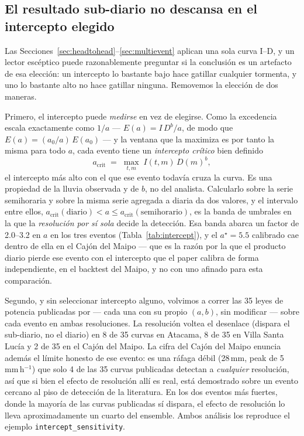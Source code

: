 \documentclass[authoryear,preprint,review,12pt]{elsarticle}
\begin{document}
\subsection{El resultado sub-diario no descansa en el intercepto elegido}
\label{sec:intercept}

Las Secciones~\ref{sec:headtohead}--\ref{sec:multievent} aplican una sola curva
I--D, y un lector escéptico puede razonablemente preguntar si la conclusión es un
artefacto de esa elección: un intercepto lo bastante bajo hace gatillar cualquier
tormenta, y uno lo bastante alto no hace gatillar ninguna. Removemos la elección de
dos maneras.

Primero, el intercepto puede \emph{medirse} en vez de elegirse. Como la excedencia
escala exactamente como $1/a$ --- $E(a)=I\,D^{b}/a$, de modo que
$E(a)=(a_0/a)\,E(a_0)$ --- y la ventana que la maximiza es por tanto la misma para
todo $a$, cada evento tiene un \emph{intercepto crítico} bien definido
\begin{equation}
a_\mathrm{crit} \;=\; \max_{t,m}\; I(t,m)\,D(m)^{b},
\label{eq:acrit}
\end{equation}
el intercepto más alto con el que ese evento todavía cruza la curva. Es una
propiedad de la lluvia observada y de $b$, no del analista. Calcularlo sobre la
serie semihoraria y sobre la misma serie agregada a diaria da dos valores, y el
intervalo entre ellos,
$a_\mathrm{crit}(\text{diario}) < a \leq a_\mathrm{crit}(\text{semihorario})$, es la
banda de umbrales en la que la \emph{resolución por sí sola} decide la detección.
Esa banda abarca un factor de 2.0--3.2 en $a$ en los tres eventos
(Tabla~\ref{tab:intercept}), y el $a^\star=5.5$ calibrado cae dentro de ella en el
Cajón del Maipo --- que es la razón por la que el producto diario pierde ese evento
con el intercepto que el paper calibra de forma independiente, en el backtest del
Maipo, y no con uno afinado para esta comparación.

Segundo, y sin seleccionar intercepto alguno, volvimos a correr las 35 leyes de
potencia publicadas por \citet{guzzetti2007} --- cada una con su propio $(a,b)$,
sin modificar --- sobre cada evento en ambas resoluciones. La resolución voltea el
desenlace (dispara el sub-diario, no el diario) en 8 de 35 curvas en Atacama, 8 de
35 en Villa Santa Lucía y 2 de 35 en el Cajón del Maipo. La cifra del Cajón del
Maipo enuncia además el límite honesto de ese evento: es una ráfaga débil (28\,mm,
peak de 5\,mm\,h$^{-1}$) que solo 4 de las 35 curvas publicadas detectan a
\emph{cualquier} resolución, así que si bien el efecto de resolución allí es real,
está demostrado sobre un evento cercano al piso de detección de la literatura. En
los dos eventos más fuertes, donde la mayoría de las curvas publicadas sí dispara,
el efecto de resolución lo lleva aproximadamente un cuarto del ensemble. Ambos
análisis los reproduce el ejemplo \texttt{intercept\_sensitivity}.
\end{document}
